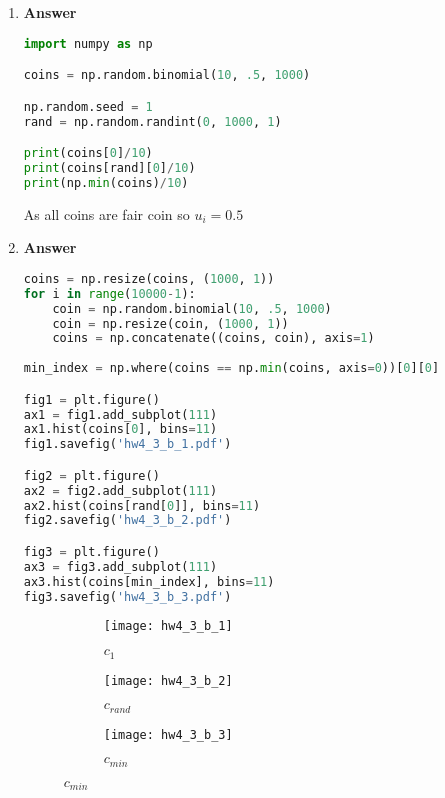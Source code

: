 \documentclass[11pt]{article}
\begin{document}
\begin{enumerate}[label=(\alph*)]


\item  \textbf{Answer}

\begin{lstlisting}[language=Python, showstringspaces=false]
import numpy as np

coins = np.random.binomial(10, .5, 1000)

np.random.seed = 1
rand = np.random.randint(0, 1000, 1)

print(coins[0]/10)
print(coins[rand][0]/10)
print(np.min(coins)/10)
\end{lstlisting}

As  all coins are fair coin so $u_i = 0.5$


\item  \textbf{Answer}

\begin{lstlisting}[language=Python, showstringspaces=false]
coins = np.resize(coins, (1000, 1))
for i in range(10000-1):
    coin = np.random.binomial(10, .5, 1000)
    coin = np.resize(coin, (1000, 1))
    coins = np.concatenate((coins, coin), axis=1)
    
min_index = np.where(coins == np.min(coins, axis=0))[0][0]

fig1 = plt.figure()
ax1 = fig1.add_subplot(111)
ax1.hist(coins[0], bins=11)
fig1.savefig('hw4_3_b_1.pdf')

fig2 = plt.figure()
ax2 = fig2.add_subplot(111)
ax2.hist(coins[rand[0]], bins=11)
fig2.savefig('hw4_3_b_2.pdf')

fig3 = plt.figure()
ax3 = fig3.add_subplot(111)
ax3.hist(coins[min_index], bins=11)
fig3.savefig('hw4_3_b_3.pdf')
\end{lstlisting}

\begin{figure}[H]

\begin{subfigure}{.5\textwidth}
  \centering
  \texttt{[image: hw4\_3\_b\_1]}
  \caption{$c_1$}
  \label{fig:hw4_3_b_1}
\end{subfigure}
\begin{subfigure}{.5\textwidth}
  \centering
  \texttt{[image: hw4\_3\_b\_2]}
  \caption{$c_{rand}$}
  \label{fig:hw4_3_b_2}
\end{subfigure}
\begin{subfigure}{.5\textwidth}
  \centering
  \texttt{[image: hw4\_3\_b\_3]}
  \caption{$c_{min}$}
  \label{fig:hw4_3_b_3}
\end{subfigure}


\end{figure}
\end{enumerate}
\end{document}
